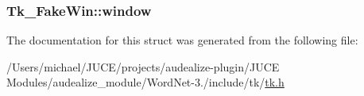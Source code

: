 \subsubsection[{\texorpdfstring{window}{window}}]{ Tk\+\_\+\+Fake\+Win\+::window}\hypertarget{struct_tk___fake_win_a6677dcc720dc9930caa2a103869d7c94}{}\label{struct_tk___fake_win_a6677dcc720dc9930caa2a103869d7c94}


The documentation for this struct was generated from the following file\+:\begin{DoxyCompactItemize}
\item 
/\+Users/michael/\+J\+U\+C\+E/projects/audealize-\/plugin/\+J\+U\+C\+E Modules/audealize\+\_\+module/\+Word\+Net-\/3./include/tk/\hyperlink{tk_8h}{tk.\+h}\end{DoxyCompactItemize}
